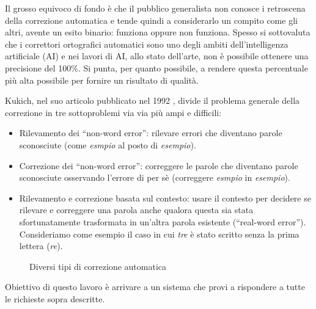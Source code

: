 Il grosso equivoco di fondo è che il pubblico generalista non conosce i retroscena della correzione automatica e tende quindi a considerarlo un compito come gli altri, avente un esito binario: funziona oppure non funziona. Spesso si sottovaluta che i correttori ortografici automatici sono uno degli ambiti dell'intelligenza artificiale (AI) e nei lavori di AI, allo stato dell'arte, non è possibile ottenere una precisione del 100\%. Si punta, per quanto possibile, a rendere questa percentuale più alta possibile per fornire un risultato di qualità.

Kukich, nel suo articolo pubblicato nel 1992 \cite{kukich}, divide il problema generale della correzione in tre sottoproblemi via via più ampi e difficili:
\begin{itemize}
	\item Rilevamento dei ``non-word error'': rilevare errori che diventano parole sconosciute (come \emph{esmpio} al posto di \emph{esempio}).
	\item Correzione dei ``non-word error'': correggere le parole che diventano parole sconosciute osservando l'errore di per sè (correggere \emph{esmpio} in \emph{esempio}).
	\item Rilevamento e correzione basata sul contesto: usare il contesto per decidere se rilevare e correggere una parola anche qualora questa sia stata sfortunatamente trasformata in un'altra parola esistente (``real-word error''). Consideriamo come esempio il caso in cui \emph{tre} è stato scritto senza la prima lettera (\emph{re}).
\end{itemize}

\begin{figure}[!h]
\centering
{}
\caption{Diversi tipi di correzione automatica}
\end{figure}


Obiettivo di questo lavoro è arrivare a un sistema che provi a rispondere a tutte le richieste sopra descritte.